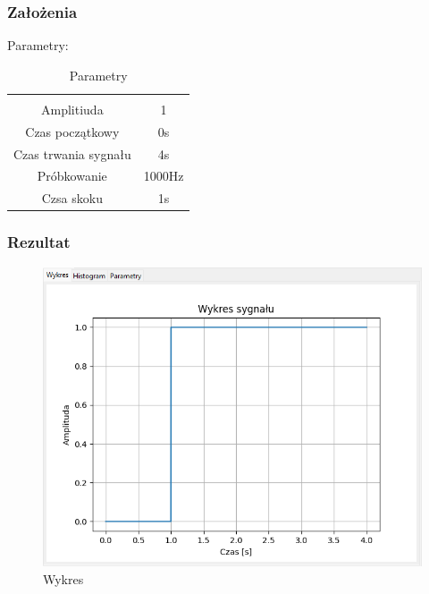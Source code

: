 \documentclass{article}
\begin{document}
\subsubsection{Założenia}
\noindent
Parametry:
\begin{table}[h!]
    \centering
    \vspace{0.2cm}
    \begin{tabular}{|c|c|}
        \hline\hline\\[-0.4cm]
        Amplitiuda & 1  \\
        \hline
        Czas początkowy & 0s  \\
        \hline
        Czas trwania sygnału & 4s  \\
        \hline
        Próbkowanie & 1000Hz \\
        \hline
        Czsa skoku & 1s\\
        \hline
    \end{tabular}
    \caption{Parametry}
    \label{skokjednostowy}
\end{table}
\subsubsection{Rezultat}
\begin{figure}[h!]
    \centering
    \includegraphics[width=\textwidth]{img/skok/wykres.png}
    \caption{Wykres}
\end{figure}
\end{document}
